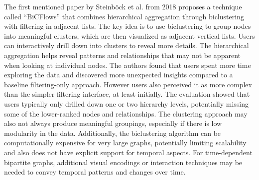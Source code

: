 \documentclass{vgtc}
\begin{document}

\medskip

The first mentioned paper by Steinböck et al. from 2018 \cite{Steinbck2018CasualVE} proposes a technique called ``BiCFlows'' that combines hierarchical aggregation through biclustering with filtering in adjacent lists. The key idea is to use biclustering to group nodes into meaningful clusters, which are then visualized as adjacent vertical lists. Users can interactively drill down into clusters to reveal more details. The hierarchical aggregation helps reveal patterns and relationships that may not be apparent when looking at individual nodes. The authors found that users spent more time exploring the data and discovered more unexpected insights compared to a baseline filtering-only approach. However users also perceived it as more complex than the simpler filtering interface, at least initially. The evaluation showed that users typically only drilled down one or two hierarchy levels, potentially missing some of the lower-ranked nodes and relationships. The clustering approach may also not always produce meaningful groupings, especially if there is low modularity in the data. Additionally, the biclustering algorithm can be computationally expensive for very large graphs, potentially limiting scalability and also does not have explicit support for temporal aspects. For time-dependent bipartite graphs, additional visual encodings or interaction techniques may be needed to convey temporal patterns and changes over time.

\medskip
\end{document}
